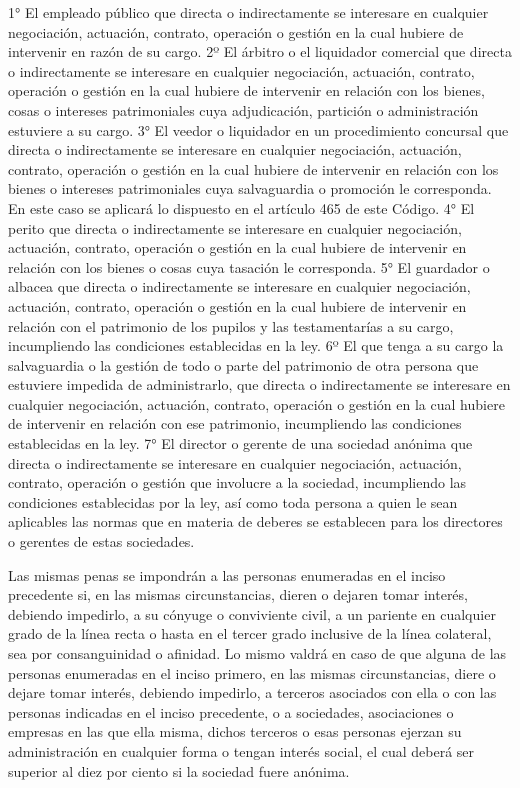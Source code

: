     1° El empleado público que directa o indirectamente se interesare en cualquier negociación, actuación, contrato, operación o gestión en la cual hubiere de intervenir en razón de su cargo.
    2º El árbitro o el liquidador comercial que directa o indirectamente se interesare en cualquier negociación, actuación, contrato, operación o gestión en la cual hubiere de intervenir en relación con los bienes, cosas o intereses patrimoniales cuya adjudicación, partición o administración estuviere a su cargo.
    3° El veedor o liquidador en un procedimiento concursal que directa o indirectamente se interesare en cualquier negociación, actuación, contrato, operación o gestión en la cual hubiere de intervenir en relación con los bienes o intereses patrimoniales cuya salvaguardia o promoción le corresponda.
    En este caso se aplicará lo dispuesto en el artículo 465 de este Código.
    4° El perito que directa o indirectamente se interesare en cualquier negociación, actuación, contrato, operación o gestión en la cual hubiere de intervenir en relación con los bienes o cosas cuya tasación le corresponda.
    5° El guardador o albacea que directa o indirectamente se interesare en cualquier negociación, actuación, contrato, operación o gestión en la cual hubiere de intervenir en relación con el patrimonio de los pupilos y las testamentarías a su cargo, incumpliendo las condiciones establecidas en la ley.
    6º El que tenga a su cargo la salvaguardia o la gestión de todo o parte del patrimonio de otra persona que estuviere impedida de administrarlo, que directa o indirectamente se interesare en cualquier negociación, actuación, contrato, operación o gestión en la cual hubiere de intervenir en relación con ese patrimonio, incumpliendo las condiciones establecidas en la ley.
    7° El director o gerente de una sociedad anónima que directa o indirectamente se interesare en cualquier negociación, actuación, contrato, operación o gestión que involucre a la sociedad, incumpliendo las condiciones establecidas por la ley, así como toda persona a quien le sean aplicables las normas que en materia de deberes se establecen para los directores o gerentes de estas sociedades.
   
    Las mismas penas se impondrán a las personas enumeradas en el inciso precedente si, en las mismas circunstancias, dieren o dejaren tomar interés, debiendo impedirlo, a su cónyuge o conviviente civil, a un pariente en cualquier grado de la línea recta o hasta en el tercer grado inclusive de la línea colateral, sea por consanguinidad o afinidad.
    Lo mismo valdrá en caso de que alguna de las personas enumeradas en el inciso primero, en las mismas circunstancias, diere o dejare tomar interés, debiendo impedirlo, a terceros asociados con ella o con las personas indicadas en el inciso precedente, o a sociedades, asociaciones o empresas en las que ella misma, dichos terceros o esas personas ejerzan su administración en cualquier forma o tengan interés social, el cual deberá ser superior al diez por ciento si la sociedad fuere anónima.




